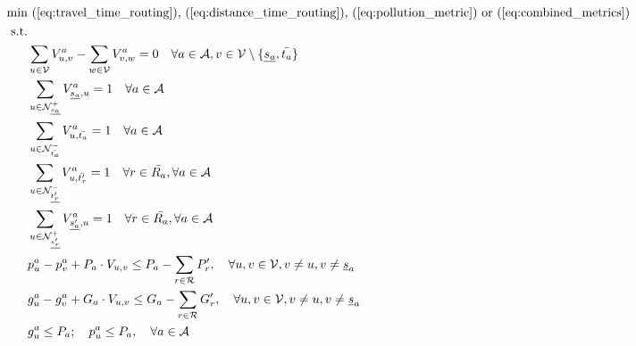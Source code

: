 \begin{align}
	\text{min}&  \text{
	(\ref{eq:travel_time_routing}), (\ref{eq:distance_time_routing}), (\ref{eq:pollution_metric}) or (\ref{eq:combined_metrics})
	}\nonumber\\
	\text{s.t.} &\nonumber\\
&\sum_{u \in \mathcal{V}} V^a_{u, v} - \sum_{w \in \mathcal{V}} V^a_{v, w} = 0 \quad \forall a \in \mathcal{A}, v \in \mathcal{V} \setminus \{\underline{s_a}, \bar{t_a}\} \label{eq:flow_conservation_graph_u} \\
&\sum_{ u \in \mathcal{N}^+_{\underline{s_a}} }V^a_{ \underline{s_a},u} = 1 \quad \forall a \in \mathcal{A} \label{eq:flow_cons_arrival_graph_u}\\
&\sum_{u \in \mathcal{N}^-_{\bar{t_a}} } V^a_{u, \bar{t_a}} = 1 \quad \forall a \in \mathcal{A} \label{eq:flow_cons_departure_graph_u}\\
&\sum_{u \in \mathcal{N}^-_{\underline{t'_r}} } V^a_{u, \bar{t'_r}} = 1 \quad \forall r \in \bar{R_a}, \forall a \in \mathcal{A} 	\label{eq:flow_cons_arrival_graph_v_u}\\
&\sum_{u \in \mathcal{N}^+_{\underline{s'_r}} } V^a_{ \underline{s'_a},u} = 1 \quad \forall r \in \bar{R_a}, \forall a \in \mathcal{A}\label{eq:flow_cons_departure_graph_v_u}\\
&{p^a_u - p^a_v + P_a \cdot V_{u,v} \leq P_{a} - \sum_{r\in\mathcal{R}}P'_r, \quad \forall u, v \in \mathcal{V}, v \neq u, v \neq \underline{s}_a}\label{eq:no_sub_tour_g}\\
&{g^a_u - g^a_v + G_a \cdot V_{u,v} \leq G_{a} - \sum_{r\in\mathcal{R}}G'_r, \quad \forall u, v \in \mathcal{V}, v \neq u, v \neq \underline{s}_a}\label{eq:no_sub_tour_p}\\
&g^a_u \leq P_a;\quad p^a_u \leq P_a,   \quad\forall a \in \mathcal{A}\label{eq:final_req}\\
\nonumber
\end{align}



